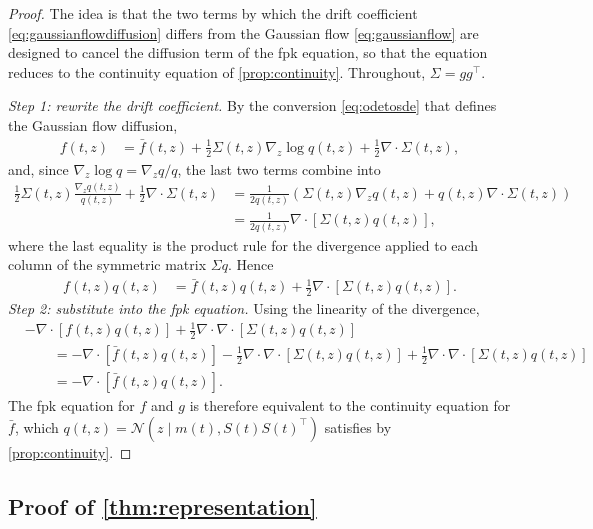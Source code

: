 \documentclass{article} %
\newcommand{\postdrift}{f}
\newcommand{\odedrift}{\bar f}
\newcommand{\vol}{g}
\newcommand{\Norm}{\mathcal{N}}
\begin{document}
\begin{proof}
The idea is that the two terms by which the drift coefficient \cref{eq:gaussianflowdiffusion} differs from the Gaussian flow \cref{eq:gaussianflow} are designed to cancel the diffusion term of the \gls{fpk} equation, so that the equation reduces to the continuity equation of \cref{prop:continuity}. Throughout, $\Sigma = \vol \vol^\top$.

\emph{Step 1: rewrite the drift coefficient.} By the conversion \cref{eq:odetosde} that defines the Gaussian flow diffusion,
\begin{align*}
     \postdrift(t,z) &= \odedrift(t,z) + \frac{1}{2}\Sigma(t,z) \nabla_z \log q(t, z) + \frac{1}{2}\nabla \cdot \Sigma(t, z),
\end{align*}
and, since $\nabla_z \log q = \nabla_z q / q$, the last two terms combine into
\begin{align*}
     \frac{1}{2} \Sigma(t,z) \frac{\nabla_z q(t, z)}{q(t,z)} + \frac{1}{2} \nabla \cdot \Sigma(t, z)
     &= \frac{1}{2 q(t, z)} \left(\Sigma(t,z)\nabla_z q(t, z) + q(t, z)\nabla \cdot \Sigma(t, z) \right) \\
     &= \frac{1}{2 q(t, z)} \nabla \cdot[\Sigma(t, z) q(t, z)],
\end{align*}
where the last equality is the product rule for the divergence applied to each column of the symmetric matrix $\Sigma q$. Hence
\begin{align*}
     \postdrift(t,z) q(t, z) &= \odedrift(t,z) q(t, z) + \frac{1}{2} \nabla \cdot[\Sigma(t, z) q(t, z)].
\end{align*}
\emph{Step 2: substitute into the \gls{fpk} equation.} Using the linearity of the divergence,
\begin{align*}
    &-\nabla \cdot [\postdrift(t,z) q(t, z)] + \frac{1}{2} \nabla \cdot\nabla \cdot[\Sigma(t,z) q(t, z)] \\
    &\qquad = -\nabla \cdot [\odedrift(t,z) q(t, z)] - \frac{1}{2} \nabla \cdot \nabla \cdot[\Sigma(t, z) q(t, z)] + \frac{1}{2} \nabla \cdot\nabla \cdot[\Sigma(t,z) q(t, z)] \\
    &\qquad = -\nabla \cdot [\odedrift(t,z) q(t, z)].
\end{align*}
The \gls{fpk} equation for $\postdrift$ and $\vol$ is therefore equivalent to the continuity equation for $\odedrift$, which $q(t, z) = \Norm(z \mid m(t), S(t)S(t)^\top)$ satisfies by \cref{prop:continuity}.
\end{proof}

\subsection{Proof of \texorpdfstring{\cref{thm:representation}}{Theorem 1}}\label{sec:proofgaussian}
\end{document}
